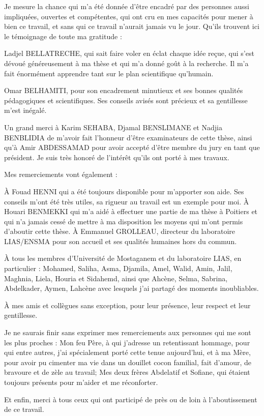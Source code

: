 \renewcommand{\AcknowledgmentName}{Remerciements}
\begin{ThesisAcknowledgments}

Je mesure la chance qui m'a été donnée d'être encadré par des personnes aussi impliquées, ouvertes et compétentes, qui ont cru en mes capacités pour mener à bien ce travail, et sans qui ce travail n'aurait jamais vu le jour. Qu'ils trouvent ici le témoignage de toute ma gratitude :

Ladjel BELLATRECHE, qui sait faire voler en éclat chaque idée reçue, qui s'est dévoué généreusement à ma thèse et qui m'a donné goût à la recherche. Il m'a fait énormément apprendre tant sur le plan scientifique qu'humain.

Omar BELHAMITI, pour son encadrement minutieux et ses bonnes qualités pédagogiques et scientifiques. Ses conseils avisés sont précieux et sa gentillesse m'est inégalé.

Un grand merci à Karim SEHABA, Djamal BENSLIMANE et Nadjia BENBLIDIA de m'avoir fait l'honneur d'être examinateurs de cette thèse, ainsi qu'à Amir ABDESSAMAD pour avoir accepté d'être membre du jury en tant que président. Je suis très honoré de l'intérêt qu'ils ont porté à mes travaux.

Mes remerciements vont également :

À Fouad HENNI qui a été toujours disponible pour m'apporter son aide. Ses conseils m'ont été très utiles, sa rigueur au travail est un exemple pour moi.
À Houari BENMEKKI qui m'a aidé à effectuer une partie de ma thèse à Poitiers et qui n'a jamais cessé de mettre à ma disposition les moyens qui m'ont permis d'aboutir cette thèse. À Emmanuel GROLLEAU, directeur du laboratoire LIAS/ENSMA pour son accueil et ses qualités humaines hors du commun.

À tous les membres d'Université de Mostaganem et du laboratoire LIAS, en particulier : Mohamed, Saliha, Asma, Djamila, Amel, Walid, Amin, Jalil, Maghnia, Liela, Houria et Sidahemd, ainsi que Ahcène, Selma, Sabrina, Abdelkader, Aymen, Lahcène avec lesquels j'ai
 partagé des moments inoubliables.

À mes amis et collègues sans exception, pour leur présence, leur respect et leur gentillesse.

Je ne saurais finir sans exprimer mes remerciements aux personnes qui me sont les plus proches :
Mon feu Père, à qui j'adresse un retentissant hommage, pour qui entre autres, j’ai spécialement porté cette tenue aujourd’hui, et à ma Mère, pour avoir pu cimenter ma vie dans un douillet cocon familial, fait d’amour, de bravoure et de zèle au travail; Mes deux frères Abdelatif et Sofiane, qui étaient toujours présents pour m'aider et me réconforter.

Et enfin, merci à tous ceux qui ont participé de près ou de loin à l’aboutissement de ce travail.

\end{ThesisAcknowledgments}

